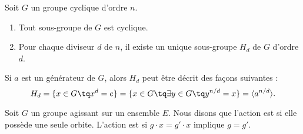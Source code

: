 \begin{theorem}
    Soit \( G\) un groupe cyclique d'ordre \( n\).
    \begin{enumerate}
        \item
            Tout sous-groupe de \( G\) est cyclique.
        \item
            Pour chaque diviseur \( d\) de \( n\), il existe un unique sous-groupe \( H_d\) de \( G\) d'ordre \( d\).
    \end{enumerate}
    Si \( a\) est un générateur de \( G\), alors \( H_d\) peut être décrit des façons suivantes :
    \begin{equation}
        H_d=\{ x\in G\tq x^d=e \}=\{ x\in G\tq\exists y\in G\tq y^{n/d}=x \}=\langle a^{n/d}\rangle.
    \end{equation}
\end{theorem}


\begin{definition}
    Soit \( G\) un groupe agissant sur un ensemble \( E\). Nous disons que l'action est  si elle possède une seule orbite. L'action est  si \( g\cdot x=g'\cdot x\) implique \( g=g'\).
\end{definition}
